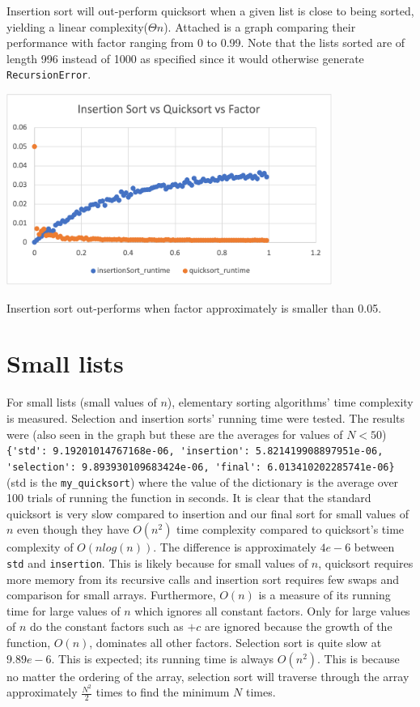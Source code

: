 \documentclass{article}
\begin{document}
\medskip
Insertion sort will out-perform quicksort when a given list is close to being sorted, 
yielding a linear complexity($\Theta{n}$). Attached is a graph comparing their 
performance with factor ranging from 0 to 0.99. Note that the lists sorted are of 
length 996 instead of 1000 as specified since it would otherwise generate \verb|RecursionError|.

\includegraphics[width=0.8\textwidth]{insertionSort_vs_quicksort_vs_factor}

Insertion sort out-performs when factor approximately is smaller than 0.05.

\section*{Small lists}
For small lists (small values of $n$), elementary sorting algorithms’ time complexity is measured. Selection and insertion sorts’ running time were tested. The results were (also seen in the graph but these are the averages for values of $N < 50$) \verb|{'std': 9.19201014767168e-06, 'insertion': 5.821419908897951e-06, 'selection': 9.893930109683424e-06, 'final': 6.013410202285741e-06}| (std is the \verb|my_quicksort|) where the value of the dictionary is the average over 100 trials of running the function in seconds. It is clear that the standard quicksort is very slow compared to insertion and our final sort for small values of $n$ even though they have $O(n^2)$ time complexity compared to quicksort’s time complexity of $O(nlog(n))$. The difference is approximately $4e-6$ between \verb|std| and \verb|insertion|. This is likely because for small values of $n$, quicksort requires more memory from its recursive calls and insertion sort requires few swaps and comparison for small arrays. Furthermore, $O(n)$ is a measure of its running time for large values of $n$ which ignores all constant factors. Only for large values of $n$ do the constant factors such as $+c$ are ignored because the growth of the function, $O(n)$, dominates all other factors. Selection sort is quite slow at $9.89e-6$. This is expected; its running time is always $O(n^2)$. This is because no matter the ordering of the array, selection sort will traverse through the array approximately $\frac{N^2}{2}$ times to find the minimum $N$ times. 
\end{document}
